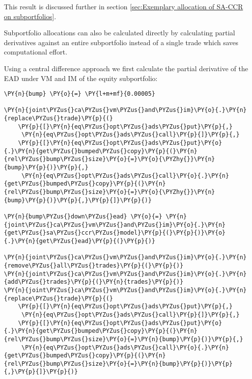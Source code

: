     This result is discussed further in section
\ref{sec:Exemplary allocation of SA-CCR on subportfolios}.

    Subportfolio allocations can also be calculated directly by calculating
partial derivatives against an entire subportfolio instead of a single
trade which saves computational effort.

Using a central difference approach we first calculate the partial
derivative of the EAD under VM and IM of the equity subportfolio:

    \begin{tcolorbox}[breakable, size=fbox, boxrule=1pt, pad at break*=1mm,colback=cellbackground, colframe=cellborder]
\begin{Verbatim}[commandchars=\\\{\}]
\PY{n}{bump} \PY{o}{=} \PY{l+m+mf}{0.00005}

\PY{n}{joint\PYZus{}ca\PYZus{}vm\PYZus{}and\PYZus{}im}\PY{o}{.}\PY{n}{replace\PYZus{}trade}\PY{p}{(}
    \PY{p}{[}\PY{n}{eq\PYZus{}opt\PYZus{}ads\PYZus{}put}\PY{p}{,}
     \PY{n}{eq\PYZus{}opt\PYZus{}ads\PYZus{}call}\PY{p}{]}\PY{p}{,}
    \PY{p}{[}\PY{n}{eq\PYZus{}opt\PYZus{}ads\PYZus{}put}\PY{o}{.}\PY{n}{get\PYZus{}bumped\PYZus{}copy}\PY{p}{(}\PY{n}{rel\PYZus{}bump\PYZus{}size}\PY{o}{=}\PY{o}{\PYZhy{}}\PY{n}{bump}\PY{p}{)}\PY{p}{,}
     \PY{n}{eq\PYZus{}opt\PYZus{}ads\PYZus{}call}\PY{o}{.}\PY{n}{get\PYZus{}bumped\PYZus{}copy}\PY{p}{(}\PY{n}{rel\PYZus{}bump\PYZus{}size}\PY{o}{=}\PY{o}{\PYZhy{}}\PY{n}{bump}\PY{p}{)}\PY{p}{,}\PY{p}{]}\PY{p}{)}

\PY{n}{bump\PYZus{}down\PYZus{}ead} \PY{o}{=} \PY{n}{joint\PYZus{}ca\PYZus{}vm\PYZus{}and\PYZus{}im}\PY{o}{.}\PY{n}{get\PYZus{}sa\PYZus{}ccr\PYZus{}model}\PY{p}{(}\PY{p}{)}\PY{o}{.}\PY{n}{get\PYZus{}ead}\PY{p}{(}\PY{p}{)}

\PY{n}{joint\PYZus{}ca\PYZus{}vm\PYZus{}and\PYZus{}im}\PY{o}{.}\PY{n}{remove\PYZus{}all\PYZus{}trades}\PY{p}{(}\PY{p}{)}
\PY{n}{joint\PYZus{}ca\PYZus{}vm\PYZus{}and\PYZus{}im}\PY{o}{.}\PY{n}{add\PYZus{}trades}\PY{p}{(}\PY{n}{trades}\PY{p}{)}
\PY{n}{joint\PYZus{}ca\PYZus{}vm\PYZus{}and\PYZus{}im}\PY{o}{.}\PY{n}{replace\PYZus{}trade}\PY{p}{(}
    \PY{p}{[}\PY{n}{eq\PYZus{}opt\PYZus{}ads\PYZus{}put}\PY{p}{,}
     \PY{n}{eq\PYZus{}opt\PYZus{}ads\PYZus{}call}\PY{p}{]}\PY{p}{,}
    \PY{p}{[}\PY{n}{eq\PYZus{}opt\PYZus{}ads\PYZus{}put}\PY{o}{.}\PY{n}{get\PYZus{}bumped\PYZus{}copy}\PY{p}{(}\PY{n}{rel\PYZus{}bump\PYZus{}size}\PY{o}{=}\PY{n}{bump}\PY{p}{)}\PY{p}{,}
     \PY{n}{eq\PYZus{}opt\PYZus{}ads\PYZus{}call}\PY{o}{.}\PY{n}{get\PYZus{}bumped\PYZus{}copy}\PY{p}{(}\PY{n}{rel\PYZus{}bump\PYZus{}size}\PY{o}{=}\PY{n}{bump}\PY{p}{)}\PY{p}{,}\PY{p}{]}\PY{p}{)}


\end{Verbatim}
\end{tcolorbox}

